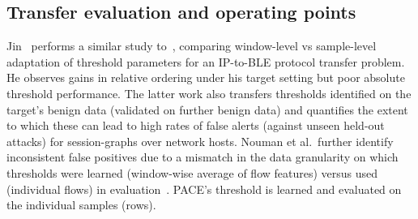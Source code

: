 \subsection{Transfer evaluation and operating points} 
Jin~\cite{jin2026crossprotocol} performs a similar study to~\cite{ha2026targetfpr}, comparing window-level vs sample-level adaptation of threshold parameters for an IP-to-BLE protocol transfer problem. He observes gains in relative ordering under his target setting but poor absolute threshold performance. The latter work also transfers thresholds identified on the target's benign data (validated on further benign data) and quantifies the extent to which these can lead to high rates of false alerts (against unseen held-out attacks) for session-graphs over network hosts. Nouman et al.\ further identify inconsistent false positives due to a mismatch in the data granularity on which thresholds were learned (window-wise average of flow features) versus used (individual flows) in evaluation~\cite{nouman2026granularity}. PACE's threshold is learned and evaluated on the individual samples (rows).